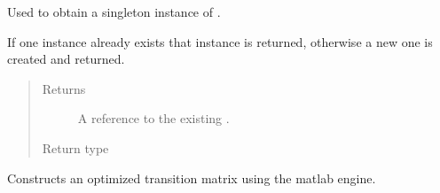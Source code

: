 \documentclass[letterpaper,10pt,english]{sphinxmanual}
\begin{document}
\begin{fulllineitems}
\begin{fulllineitems}
\begin{quote}
\begin{description}
\end{description}\end{quote}

\end{fulllineitems}


\begin{fulllineitems}
\label{\detokenize{app.domain.helpers:app.domain.helpers.matlab_utils.MatlabEngineContainer.get_instance}}
Used to obtain a singleton instance of .

If one instance already exists that instance is returned,
otherwise a new one is created and returned.
\begin{quote}\begin{description}
\item[{Returns}] \leavevmode
A reference to the existing 
{\hyperref[\detokenize{app.domain.helpers:app.domain.helpers.matlab_utils.MatlabEngineContainer._instance}]{}}.

\item[{Return type}] \leavevmode
{\hyperref[\detokenize{app.domain.helpers:app.domain.helpers.matlab_utils.MatlabEngineContainer}]{}}

\end{description}\end{quote}

\end{fulllineitems}


\begin{fulllineitems}
\label{\detokenize{app.domain.helpers:app.domain.helpers.matlab_utils.MatlabEngineContainer.matrix_global_opt}}
Constructs an optimized transition matrix using the matlab engine.


\end{fulllineitems}
\end{fulllineitems}
\end{document}
